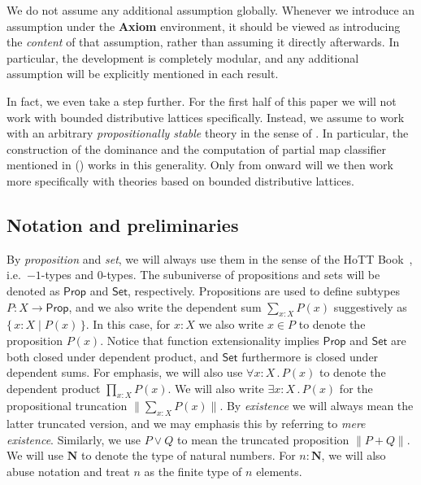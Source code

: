\documentclass[12pt]{amsart}
\theoremstyle{definition}
\newcommand{\mb}[1]{\mathbf{#1}}
\newcommand{\ms}[1]{\mathsf{#1}}
\newcommand{\scomp}[2]{\{\,#1\mid#2\,\}}
\newcommand{\N}{\mb N}
\newcommand{\fa}[2]{\forall #1\!\colon\!\!#2\mathpunct{.}}
\newcommand{\ex}[2]{\exists #1\!\colon\!\!#2\mathpunct{.}}
\newcommand{\pss}[1]{\lVert #1\rVert} %
\newcommand{\pp}{\ms{Prop}}
\newcommand{\st}{\ms{Set}}
\begin{document}
We do not assume any additional assumption globally. Whenever we introduce an assumption under the \textbf{Axiom} environment, it should be viewed as introducing the \emph{content} of that assumption, rather than assuming it directly afterwards. In particular, the development is completely modular, and any additional assumption will be explicitly mentioned in each result.

In fact, we even take a step further. For the first half of this paper we will not work with bounded distributive lattices specifically. Instead, we assume to work with an arbitrary \emph{propositionally stable} theory in the sense of . In particular, the construction of the dominance and the computation of partial map classifier mentioned in  () works in this generality. Only from  onward will we then work more specifically with theories based on bounded distributive lattices.

\subsection*{Notation and preliminaries}

By \emph{proposition} and \emph{set}, we will always use them in the sense of the HoTT Book~\cite{hottbook}, i.e.\ $-1$-types and $0$-types. The subuniverse of propositions and sets will be denoted as $\pp$ and $\st$, respectively. Propositions are used to define subtypes $P \colon X \to \pp$, and we also write the dependent sum $\sum_{x:X}P(x)$ suggestively as $\scomp{x:X}{P(x)}$. In this case, for $x:X$ we also write $x\in P$ to denote the proposition $P(x)$. Notice that function extensionality implies $\pp$ and $\st$ are both closed under dependent product, and $\st$ furthermore is closed under dependent sums. For emphasis, we will also use $\fa xXP(x)$ to denote the dependent product $\prod_{x:X}P(x)$. We will also write $\ex xXP(x)$ for the propositional truncation $\pss{\sum_{x:X}P(x)}$. By \emph{existence} we will always mean the latter truncated version, and we may emphasis this by referring to \emph{mere existence}. Similarly, we use $P \vee Q$ to mean the truncated proposition $\pss{P + Q}$. We will use $\N$ to denote the type of natural numbers. For $n:\N$, we will also abuse notation and treat $n$ as the finite type of $n$ elements. 
\end{document}
